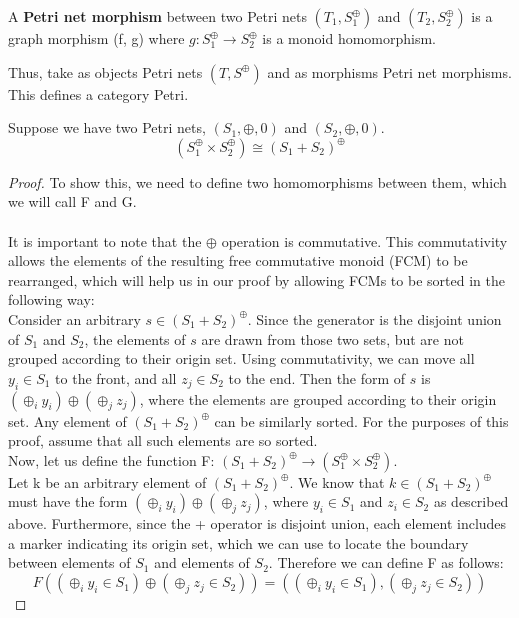 %
\begin{definition}
  \label{Petri-net-morphism}
  A \textbf{Petri net morphism} between two Petri nets $(T_1, S_1^\oplus)$ and $(T_2, S_2^\oplus)$ is a graph morphism (f, g)       
  where $g: S_1^\oplus \to S_2^\oplus$ is a monoid homomorphism.
\end{definition}
Thus, take as objects Petri nets $(T, S^\oplus)$ and as morphisms Petri net morphisms. This defines a category Petri.
\begin{lemma}
Suppose we have two Petri nets, $(S_1, \oplus, 0)$ and $(S_2, \oplus, 0)$.\\ 
\[(S_1 ^\oplus \times S_2 ^\oplus) \cong (S_1 + S_2)^\oplus\]
\begin{proof}
To show this, we need to define two homomorphisms between them, which we will call F and G.\\
\bigskip\\
It is important to note that the $\oplus$ operation is commutative. This commutativity allows the elements of the resulting free commutative monoid (FCM) to be rearranged, which will help us in our proof by allowing FCMs to be sorted in the following way:\bigskip\\
Consider an arbitrary $s \in (S_1 + S_2)^\oplus$. Since the generator is the disjoint union of $S_1$ and $S_2$, the elements of $s$ are drawn from those two sets, but are not grouped according to their origin set. Using commutativity, we can move all $y_i \in S_1$ to the front, and all $z_j \in S_2$ to the end. Then the form of $s$ is $(\oplus_i y_i) \oplus (\oplus_j z_j)$, where the elements are grouped according to their origin set. Any element of $(S_1 + S_2)^\oplus$ can be similarly sorted. For the purposes of this proof, assume that all such elements are so sorted.\bigskip \\
Now, let us define the function F: $(S_1 + S_2)^\oplus \to (S_1 ^\oplus \times S_2 ^\oplus)$.\\
Let k be an arbitrary element of $(S_1 + S_2)^\oplus$. We know that $k \in (S_1 + S_2)^\oplus$ must have the form $(\oplus_i y_i) \oplus (\oplus_j z_j)$, where $y_i \in S_1$ and $z_i \in S_2$ as described above. Furthermore, since the + operator is disjoint union, each element includes a marker indicating its origin set, which we can use to locate the boundary between elements of $S_1$ and elements of $S_2$. Therefore we can define F as follows:\\
\[F((\oplus_i y_i \in S_1) \oplus (\oplus_j z_j \in S_2)) = ((\oplus_i y_i \in S_1), (\oplus_j z_j \in S_2))\]

\end{proof}
\end{lemma}
